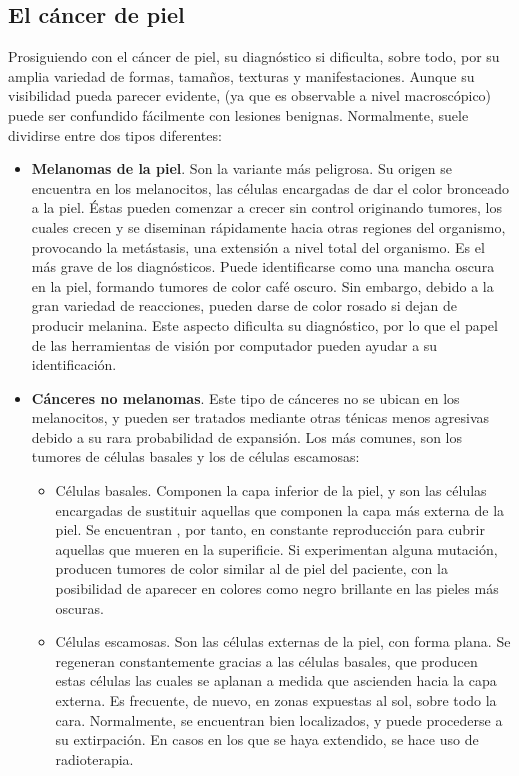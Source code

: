 \newpage
\subsection{El cáncer de piel}

Prosiguiendo con el cáncer de piel, su diagnóstico si dificulta, sobre todo, por su amplia variedad de formas, tamaños, texturas y manifestaciones. Aunque su visibilidad pueda parecer evidente, (ya que es observable a nivel macroscópico) puede ser confundido fácilmente con lesiones benignas. Normalmente, suele dividirse entre dos tipos diferentes:
\begin{itemize}
	\item \textbf{Melanomas de la piel}. Son la variante más peligrosa. Su origen se encuentra en los melanocitos, las células encargadas de dar el color bronceado a la piel.  Éstas pueden comenzar a crecer sin control originando tumores, los cuales crecen y se diseminan rápidamente hacia otras regiones del organismo, provocando la metástasis, una extensión a nivel total del organismo. Es el más grave de los diagnósticos. Puede identificarse como una mancha oscura en la piel, formando tumores de color café oscuro. Sin embargo, debido a la gran variedad de reacciones, pueden darse de color rosado si dejan de producir melanina. Este aspecto dificulta su diagnóstico, por lo que el papel de las herramientas de visión por computador pueden ayudar a su identificación.
	\item \textbf{Cánceres no melanomas}. Este tipo de cánceres no se ubican en los melanocitos, y pueden ser tratados mediante otras ténicas menos agresivas debido a su rara probabilidad de expansión. Los más comunes, son los tumores de células basales y los de células escamosas:
	\begin{itemize}
		\item Células basales. Componen la capa inferior de la piel, y son las células encargadas de sustituir aquellas que componen la capa más externa de la piel. Se encuentran , por tanto, en constante reproducción para cubrir aquellas que mueren en la superificie. Si experimentan alguna mutación, producen tumores de color similar al de piel del paciente, con la posibilidad de aparecer en colores como negro brillante en las pieles más oscuras.
		
		\item Células escamosas. Son las células externas de la piel, con forma plana. Se regeneran constantemente gracias a las células basales, que producen estas células las cuales se aplanan a medida que ascienden hacia la capa externa. Es frecuente, de nuevo, en zonas expuestas al sol, sobre todo la cara. Normalmente, se encuentran bien localizados, y puede procederse a su extirpación. En casos en los que se haya extendido, se hace uso de radioterapia.
		
	\end{itemize}
\end{itemize}

